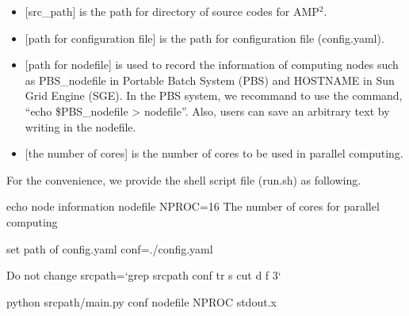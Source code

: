 \documentclass[letterpaper,10pt,english]{sphinxmanual}
\begin{document}
\begin{sphinxVerbatim}[commandchars=\\\{\}]
 \PYG{p}{[}\PYG{p}{]} \PYG{p}{[}   \PYG{p}{]} \PYG{p}{[}  \PYG{p}{]} \PYG{p}{[}   \PYG{p}{]}
\end{sphinxVerbatim}
\begin{itemize}
\item {} 
{[}src\_path{]} is the path for directory of source codes for AMP$^{\text{2}}$.

\item {} 
{[}path for configuration file{]} is the path for configuration file (config.yaml).

\item {} 
{[}path for nodefile{]} is used to record the information of computing nodes such as PBS\_nodefile in
Portable Batch System (PBS) and HOSTNAME in Sun Grid Engine (SGE). In the PBS system, we recommand to use
the command, “echo \$PBS\_nodefile \textgreater{} nodefile”. Also, users can save an arbitrary text
by writing in the nodefile.

\item {} 
{[}the number of cores{]} is the number of cores to be used in parallel computing.

\end{itemize}

For the convenience, we provide the shell script file (run.sh) as following.

\begin{sphinxVerbatim}[commandchars=\\\{\}]
echo \PYGZsq{}node information\PYGZsq{} \PYGZgt{} nodefile
NPROC=16       \PYGZsh{} The number of cores for parallel computing

\PYGZsh{}\PYGZsh{}\PYGZsh{} set path of config.yaml \PYGZsh{}\PYGZsh{}\PYGZsh{}
conf=./config.yaml
\PYGZsh{}\PYGZsh{}\PYGZsh{}\PYGZsh{}\PYGZsh{}\PYGZsh{}\PYGZsh{}\PYGZsh{}\PYGZsh{}\PYGZsh{}\PYGZsh{}\PYGZsh{}\PYGZsh{}\PYGZsh{}\PYGZsh{}\PYGZsh{}\PYGZsh{}\PYGZsh{}\PYGZsh{}\PYGZsh{}\PYGZsh{}\PYGZsh{}\PYGZsh{}\PYGZsh{}\PYGZsh{}\PYGZsh{}\PYGZsh{}\PYGZsh{}\PYGZsh{}\PYGZsh{}\PYGZsh{}

\PYGZsh{}\PYGZsh{}\PYGZsh{} Do not change \PYGZsh{}\PYGZsh{}\PYGZsh{}\PYGZsh{}\PYGZsh{}\PYGZsh{}\PYGZsh{}\PYGZsh{}\PYGZsh{}\PYGZsh{}\PYGZsh{}\PYGZsh{}\PYGZsh{}
src\PYGZus{}path={}`grep \PYGZsq{}src\PYGZus{}path\PYGZsq{} \PYGZdl{}conf \textbar{} tr \PYGZhy{}s \PYGZsq{} \PYGZsq{} \textbar{} cut \PYGZhy{}d \PYGZdq{} \PYGZdq{} \PYGZhy{}f 3{}`
\PYGZsh{}\PYGZsh{}\PYGZsh{}\PYGZsh{}\PYGZsh{}\PYGZsh{}\PYGZsh{}\PYGZsh{}\PYGZsh{}\PYGZsh{}\PYGZsh{}\PYGZsh{}\PYGZsh{}\PYGZsh{}\PYGZsh{}\PYGZsh{}\PYGZsh{}\PYGZsh{}\PYGZsh{}\PYGZsh{}\PYGZsh{}\PYGZsh{}\PYGZsh{}\PYGZsh{}\PYGZsh{}\PYGZsh{}\PYGZsh{}\PYGZsh{}\PYGZsh{}\PYGZsh{}\PYGZsh{}

python \PYGZdl{}src\PYGZus{}path/main.py \PYGZdl{}conf nodefile \PYGZdl{}NPROC \PYGZgt{}\PYGZam{} stdout.x
\end{sphinxVerbatim}
\end{document}

